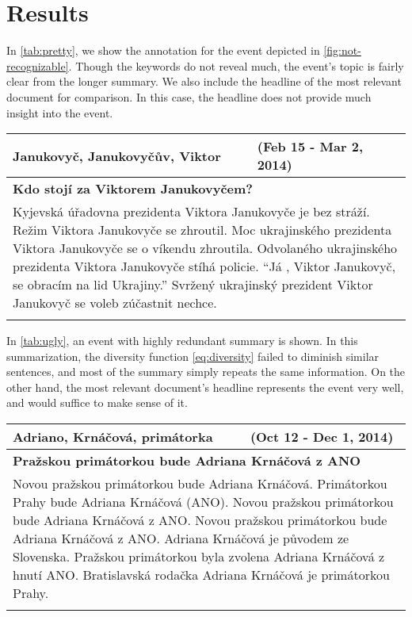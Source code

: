 \section{Results}
In \autoref{tab:pretty}, we show the annotation for the event depicted in \autoref{fig:not-recognizable}. Though the keywords do not reveal much, the event's topic is fairly clear from the longer summary. We also include the headline of the most relevant document for comparison. In this case, the headline does not provide much insight into the event.

\hspace{\fill}

\begin{tabularx}{\linewidth}{l l} \toprule[1.5pt]
\bf Janukovyč, Janukovyčův, Viktor & \bf (Feb 15 - Mar 2, 2014) \\ \midrule
\multicolumn{2}{p{\linewidth}}{\bf Kdo stojí za Viktorem Janukovyčem?} \\
\multicolumn{2}{p{\linewidth}}{Kyjevská úřadovna prezidenta Viktora Janukovyče je bez stráží. Režim Viktora Janukovyče se zhroutil. Moc ukrajinského prezidenta Viktora Janukovyče se o víkendu zhroutila. Odvolaného ukrajinského prezidenta Viktora Janukovyče stíhá policie. ``Já , Viktor Janukovyč, se obracím na lid Ukrajiny.'' Svržený ukrajinský prezident Viktor Janukovyč se voleb zúčastnit nechce.} \\ \bottomrule[1.25pt]
\caption{Annotation for the event depicted in \autoref{fig:not-recognizable}} \label{tab:pretty}
\end{tabularx}

\hspace{\fill}

In \autoref{tab:ugly}, an event with highly redundant summary is shown. In this summarization, the diversity function \eqref{eq:diversity} failed to diminish similar sentences, and most of the summary simply repeats the same information. On the other hand, the most relevant document's headline represents the event very well, and would suffice to make sense of it.

\hspace{\fill}

\begin{tabularx}{\linewidth}{l l} \toprule[1.5pt]
\bf Adriano, Krnáčová, primátorka & \bf (Oct 12 - Dec 1, 2014) \\ \midrule
\multicolumn{2}{p{\linewidth}}{\bf Pražskou primátorkou bude Adriana Krnáčová z ANO} \\
\multicolumn{2}{p{\linewidth}}{Novou pražskou primátorkou bude Adriana Krnáčová. Primátorkou Prahy bude Adriana Krnáčová (ANO). Novou pražskou primátorkou bude Adriana Krnáčová z ANO. Novou pražskou primátorkou bude Adriana Krnáčová z ANO. Adriana Krnáčová je původem ze Slovenska. Pražskou primátorkou byla zvolena Adriana Krnáčová z hnutí ANO. Bratislavská rodačka Adriana Krnáčová je primátorkou Prahy.} \\ \bottomrule[1.25pt]
\caption{Example of a summary with high degree of redundancy.} \label{tab:ugly}
\end{tabularx}

